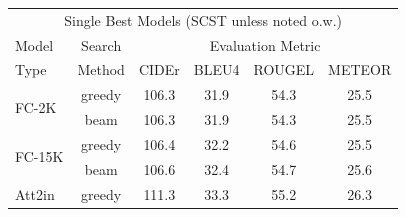 \documentclass[10pt,twocolumn,letterpaper]{article}
\begin{document}
\begin{table}[th]
\begin{tabular}{l|c|cccc}
\end{tabular}
\begin{tabular}{l|c|cccc}
\hline \hline
\multicolumn{6}{c}{\multirow{2}{*}{Single Best Models (SCST unless noted o.w.)}} \\
\multicolumn{6}{c}{}\\
\hline
Model &  Search & \multicolumn{4}{c}{Evaluation Metric} \\
Type  &Method& CIDEr & BLEU4 & ROUGEL & METEOR  \\
\hline
\multirow{2}{*}{FC-2K}   & greedy &  106.3 & 31.9 & 54.3 & 25.5  \\ %
& beam & 106.3 & 31.9 & 54.3 & 25.5  \\ %
\hline
\multirow{2}{*}{FC-15K} & greedy & 106.4 & 32.2 & 54.6 & 25.5  \\ %
& beam & 106.6 & 32.4 & 54.7 & 25.6  \\ %
\hline
\multirow{2}{*}{Att2in}   &  greedy & 111.3 & 33.3 & 55.2 &  26.3  \\ %

\end{tabular}
\end{table}
\end{document}
